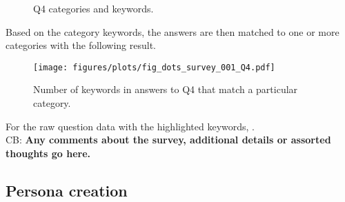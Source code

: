     \vspace{-0.3cm}
    \begin{figure}[H]
      
      \caption{Q4 categories and keywords.}
      \label{fig:ref_fig_survey_initial_Q4_categories}
    \end{figure}

    Based on the category keywords, the answers are then matched to one or more
    categories with the following result.

    \begin{figure}[H]
      \centering
      \texttt{[image: figures/plots/fig\_dots\_survey\_001\_Q4.pdf]}
      \caption{Number of keywords in answers to Q4 that match a particular category.}
      \label{fig:ref_fig_survey_initial_Q4_categories_enumeration}
    \end{figure}

    For the raw question data with the highlighted keywords,
    . \\

  CB: \textbf{%
    Any comments about the survey, additional details or assorted thoughts
    go here.
  }\\


\subsection{Persona creation}
  
%
%

